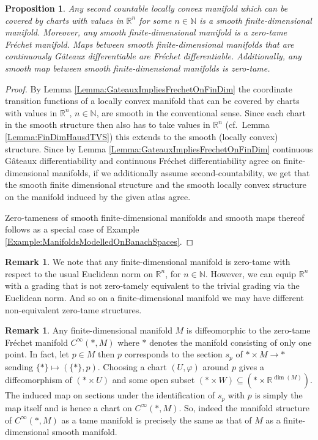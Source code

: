 \documentclass[12pt,a4paper]{article}
\theoremstyle{plain}
\newtheorem{proposition}[theorem]{Proposition}
\theoremstyle{definition}
\newtheorem{remark}[theorem]{Remark}
\newcommand{\R}{\mathbb{R}}
\newcommand{\N}{\mathbb{N}}
\begin{document}
\begin{proposition}
\label{Prop:FinDimMfdsAsFrechetMfds}
Any second countable locally convex manifold which can be covered by charts with values in $\R^n$ for some $n\in \N$ is a smooth finite-dimensional manifold. Moreover, any smooth finite-dimensional manifold is a zero-tame Fréchet manifold. Maps between smooth finite-dimensional manifolds that are continuously Gâteaux differentiable are Fréchet differentiable. Additionally, any smooth map between smooth finite-dimensional manifolds is zero-tame.
\end{proposition}
\begin{proof}
By Lemma \ref{Lemma:GateauxImpliesFrechetOnFinDim} the coordinate transition functions of a locally convex manifold that can be covered by charts with values in $\R^n$, $n\in \N$, are smooth in the conventional sense. Since each chart in the smooth structure then also has to take values in $\R^n$ (cf.~Lemma \ref{Lemma:FinDimHausdTVS}) this extends to the smooth (locally convex) structure. Since by Lemma \ref{Lemma:GateauxImpliesFrechetOnFinDim} continuous Gâteaux differentiability and continuous Fréchet differentiability agree on finite-dimensional manifolds, if we additionally assume second-countability, we get that the smooth finite dimensional structure and the smooth locally convex structure on the manifold induced by the given atlas agree.

Zero-tameness of smooth finite-dimensional manifolds and smooth maps thereof follows as a special case of Example \ref{Example:ManifoldsModelledOnBanachSpaces}. 
\end{proof}

\begin{remark}
We note that any finite-dimensional manifold is zero-tame with respect to the usual Euclidean norm on $\R^n$, for $n\in \N$. However, we can equip $\R^n$ with a grading that is not zero-tamely equivalent to the trivial grading via the Euclidean norm. And so on a finite-dimensional manifold we may have different non-equivalent zero-tame structures.
\end{remark}


\begin{remark}
\label{Rem:M=Cinfty(.,M)}
Any finite-dimensional manifold $M$ is diffeomorphic to the zero-tame Fréchet manifold $C^\infty(*,M)$ where $*$ denotes the manifold consisting of only one point. In fact, let $p\in M$ then $p$ corresponds to the section $s_p$ of $*\times M\to *$ sending $\{*\}\mapsto (\{*\},p)$. Choosing a chart $(U,\varphi)$ around $p$ gives a diffeomorphism of $(*\times U)$ and some open subset $(*\times W)\subseteq (*\times \R^{\dim(M)})$. The induced map on sections under the identification of $s_p$ with $p$ is simply the map itself and is hence a chart on $C^\infty(*,M)$. So, indeed the manifold structure of $C^\infty(*,M)$ as a tame manifold is precisely the same as that of $M$ as a finite-dimensional smooth manifold.
\end{remark}
\end{document}
